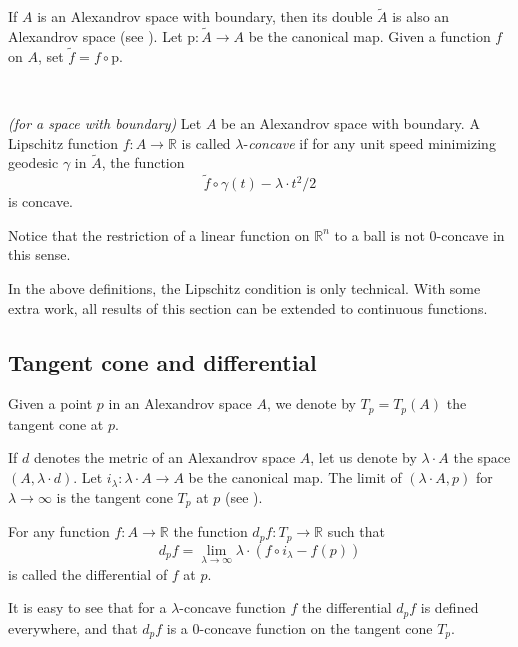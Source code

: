 \documentclass{amsart}
\begin{document}
If $A$ is an Alexandrov space with boundary, then its double $\tilde A$ is also an Alexandrov space (see \cite[5.2]{Per}).
Let $\text{p}\colon \tilde A\to A$ be the canonical map.
Given a function $f$ on $A$, set $\tilde f=f\circ \text{p}$.

\

\begin{defn}{\it (for a space with boundary)}  Let $A$ be an Alexandrov space with boundary. A Lipschitz function $f\colon A \rightarrow \mathbb{R}$ is called
$\lambda$-\emph{concave} if for any unit speed
minimizing geodesic $\gamma$ in $\tilde A$, the function
$$\tilde f\circ\gamma(t)-\lambda{\cdot}  t^2/2 $$
is concave.
\end{defn}


\begin{rmk}Notice that the restriction of a linear function on $\mathbb{R}^n$ to a ball is not $0$-concave in this sense.
\end{rmk}

\begin{rmk}
In the above definitions, the Lipschitz condition is only technical.
With some extra work,
all results of this section can be extended to continuous functions.
\end{rmk}

\subsection{Tangent cone and differential} Given a point $p$ in an Alexandrov space  $A$, we denote by $T_p=T_p(A)$ the tangent cone at $p$.

If $d$ denotes the metric of an Alexandrov space $A$,
let us denote by $\lambda{\cdot}  A$ the space $(A,\lambda{\cdot}  d)$.
Let $i_\lambda\colon  \lambda{\cdot}  A\to A$ be the canonical map.
The limit of $(\lambda{\cdot}  A,p)$ for $\lambda\to\infty$ is  the tangent cone $T_p$ at $p$ (see \cite[ 7.8.1]{BGP}).

\begin{defn} For any function $f\colon A \rightarrow \mathbb{R}$ the function $d_pf\colon T_p \rightarrow \mathbb{R}$ such that
$$d_pf=\lim_{\lambda\to\infty} \lambda{\cdot} (f\circ i_\lambda-f(p))$$
is called the differential of $f$ at $p$.
\end{defn}

It is easy to see that for a $\lambda$-concave function $f$
the differential $d_pf$ is defined everywhere, and that $d_pf$
is a $0$-concave function on the tangent cone $T_p$.
\end{document}
